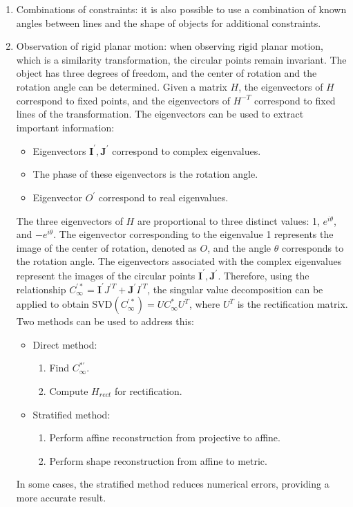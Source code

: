 \begin{enumerate}
    \item Combinations of constraints: it is also possible to use a combination of known angles between lines and the shape of objects for additional constraints.
    \item Observation of rigid planar motion: when observing rigid planar motion, which is a similarity transformation, the circular points remain invariant.
        The object has three degrees of freedom, and the center of rotation and the rotation angle can be determined.
        Given a matrix $H$, the eigenvectors of $H$ correspond to fixed points, and the eigenvectors of $H^{-T}$ correspond to fixed lines of the transformation.
        The eigenvectors can be used to extract important information:
        \begin{itemize}
            \item Eigenvectors $\mathbf{I}^\prime,\mathbf{J}^\prime$ correspond to complex eigenvalues. 
            \item The phase of these eigenvectors is the rotation angle.
            \item Eigenvector $O^\prime$ correspond to real eigenvalues. 
        \end{itemize}
        The three eigenvectors of $H$ are proportional to three distinct values: 1, $e^{i\theta}$, and $-e^{i\theta}$.
        The eigenvector corresponding to the eigenvalue 1 represents the image of the center of rotation, denoted as $O$, and the angle $\theta$ corresponds to the rotation angle. 
        The eigenvectors associated with the complex eigenvalues represent the images of the circular points $\mathbf{I}^\prime,\mathbf{J}^\prime$. 
        Therefore, using the relationship $C_{\infty}^{\prime\ast}=\mathbf{I}^\prime J^{\prime T}+\mathbf{J}^\prime I^{\prime T}$, the singular value decomposition can be applied to obtain $\text{SVD}(C_{\infty}^{\prime\ast})=UC_{\infty}^\ast U^T$, where $U^T$ is the rectification matrix. 
        Two methods can be used to address this:
        \begin{itemize}
            \item Direct method: 
                \begin{enumerate}
                    \item Find $C_{\infty}^{*'}$. 
                    \item Compute $H_{rect}$ for rectification. 
                \end{enumerate}
            \item Stratified method: 
                \begin{enumerate}
                    \item Perform affine reconstruction from projective to affine.
                    \item Perform shape reconstruction from affine to metric.
                \end{enumerate}
        \end{itemize}
        In some cases, the stratified method reduces numerical errors, providing a more accurate result.
\end{enumerate}